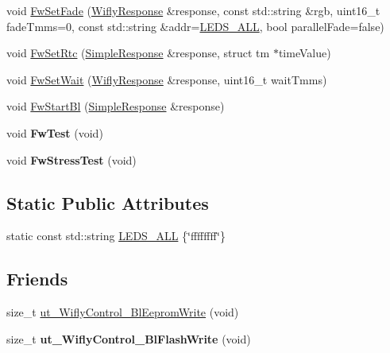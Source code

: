\begin{DoxyCompactItemize}
void \hyperlink{class_wifly_control_a9c09bac57cb017cb022b190616616975}{Fw\-Set\-Fade} (\hyperlink{class_wifly_response}{Wifly\-Response} \&response, const std\-::string \&rgb, uint16\-\_\-t fade\-Tmms=0, const std\-::string \&addr=\hyperlink{class_wifly_control_a1fb5f6703533d3ccf68f6e474f51dbce}{L\-E\-D\-S\-\_\-\-A\-L\-L}, bool parallel\-Fade=false)
\item 
void \hyperlink{class_wifly_control_a693a47088f11cba5659e3de44180f710}{Fw\-Set\-Rtc} (\hyperlink{class_simple_response}{Simple\-Response} \&response, struct tm $\ast$time\-Value)
\item 
void \hyperlink{class_wifly_control_a0caceaf85966349061bb6e435bfd557b}{Fw\-Set\-Wait} (\hyperlink{class_wifly_response}{Wifly\-Response} \&response, uint16\-\_\-t wait\-Tmms)
\item 
void \hyperlink{class_wifly_control_a155011ac62054bd61d9d29b6a6f5c2f3}{Fw\-Start\-Bl} (\hyperlink{class_simple_response}{Simple\-Response} \&response)
\item 
\hypertarget{class_wifly_control_ab7163d265422cb49fefc935da9e2857c}{void {\bfseries Fw\-Test} (void)}\label{class_wifly_control_ab7163d265422cb49fefc935da9e2857c}

\item 
\hypertarget{class_wifly_control_aa954fdf2ebcf00d628fc80231c2c4197}{void {\bfseries Fw\-Stress\-Test} (void)}\label{class_wifly_control_aa954fdf2ebcf00d628fc80231c2c4197}

\end{DoxyCompactItemize}
\subsection*{Static Public Attributes}
\begin{DoxyCompactItemize}
\item 
static const std\-::string \hyperlink{class_wifly_control_a1fb5f6703533d3ccf68f6e474f51dbce}{L\-E\-D\-S\-\_\-\-A\-L\-L} \{\char`\"{}ffffffff\char`\"{}\}
\end{DoxyCompactItemize}
\subsection*{Friends}
\begin{DoxyCompactItemize}
\item 
size\-\_\-t \hyperlink{class_wifly_control_a327c95f9335fa4b257b064ef2e917a80}{ut\-\_\-\-Wifly\-Control\-\_\-\-Bl\-Eeprom\-Write} (void)
\item 
\hypertarget{class_wifly_control_a661b9ec8a685bc800221f2fd5d031a20}{size\-\_\-t {\bfseries ut\-\_\-\-Wifly\-Control\-\_\-\-Bl\-Flash\-Write} (void)}\label{class_wifly_control_a661b9ec8a685bc800221f2fd5d031a20}

\end{DoxyCompactItemize}


